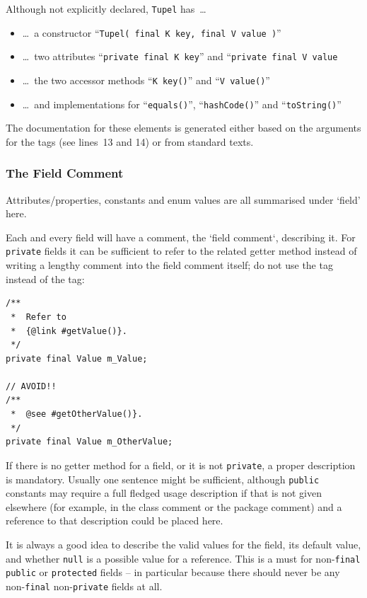 \documentclass[11pt,a4paper, titlepage, parskip=half, headsepline, footsepline, cleardoublepage=current, headheight=1cm]{scrbook}
\begin{document}
Although not explicitly declared, \lstinline|Tupel| has~…
\begin{itemize}[nosep]
\item{…~a constructor “\lstinline|Tupel( final K key, final V value )|”}
\item{…~two attributes “\lstinline|private final K key|” and “\lstinline|private final V value|}
\item{…~the two accessor methods “\lstinline|K key()|” and “\lstinline|V value()|”}
\item{…~and implementations for “\lstinline|equals()|”, “\lstinline|hashCode()|” and “\lstinline|toString()|”}
\end{itemize}

The documentation for these elements is generated either based on the arguments for the  tags (see lines~13 and 14) or from standard texts.


\subsubsection{The Field Comment}\label{sec:FieldComment}
Attributes/properties, constants and enum values are all summarised under ‘field’ here.

Each and every field will have a comment, the ‘field comment‘, describing it. For \lstinline|private| fields it can be sufficient to refer to the related getter method instead of writing a lengthy comment into the field comment itself; do not use the  tag instead of the  tag:
\begin{lstlisting}
/**
 *  Refer to
 *  {@link #getValue()}.
 */
private final Value m_Value;

// AVOID!!
/**
 *  @see #getOtherValue()}.
 */
private final Value m_OtherValue;
\end{lstlisting}

If there is no getter method for a field, or it is not \lstinline|private|, a proper description is mandatory. Usually one sentence might be sufficient, although \lstinline|public| constants may require a full fledged usage description if that is not given elsewhere (for example, in the class comment or the package comment) and a reference to that description could be placed here.

It is always a good idea to describe the valid values for the field, its default value, and whether \lstinline|null| is a possible value for a reference. This is a must for non-\lstinline|final| \lstinline|public| or \lstinline|protected| fields – in particular because there should never be any non-\lstinline|final| non-\lstinline|private| fields at all.
\end{document}
